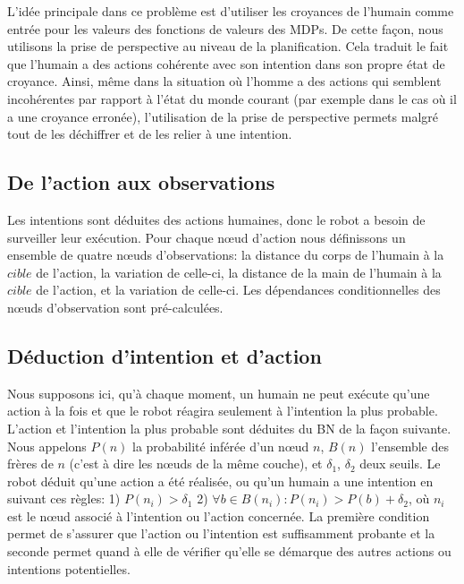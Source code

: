 \documentclass[a4paper,11pt,twoside]{StyleThese}
\begin{document}
L'idée principale dans ce problème est d'utiliser les croyances de l'humain comme entrée pour les valeurs des fonctions de valeurs des MDPs. De cette façon, nous utilisons la prise de perspective au niveau de la planification. Cela traduit le fait que l'humain a des actions cohérente avec son intention dans son propre état de croyance. Ainsi, même dans la situation où l'homme a des actions qui semblent incohérentes par rapport à l'état du monde courant (par exemple dans le cas où il a une croyance erronée), l'utilisation de la prise de perspective permets malgré tout de les déchiffrer et de les relier à une intention.


\subsection{De l'action aux observations}
\label{sec:action}
Les intentions sont déduites des actions humaines, donc le robot a besoin de surveiller leur exécution. Pour chaque nœud d'action nous définissons un ensemble de quatre nœuds d'observations: la distance du corps de l'humain à la $cible$ de l'action, la variation de celle-ci, la distance de la main de l'humain à la $cible$ de l'action, et la variation de celle-ci.
Les dépendances conditionnelles des nœuds d'observation sont pré-calculées.

\subsection{Déduction d'intention et d'action}
\label{intentiom and action inference}
Nous supposons ici, qu'à chaque moment, un humain ne peut exécute qu'une action à la fois et que le robot réagira seulement à l'intention la plus probable. L'action et l'intention la plus probable sont déduites du BN de la façon suivante. Nous appelons $P(n)$ la probabilité inférée d'un nœud  $n$, $B(n)$ l'ensemble des frères de $n$ (c'est à dire les nœuds de la même couche), et $\delta_1$, $\delta_2$ deux seuils. Le robot déduit qu'une action a été réalisée, ou qu'un humain a une intention en suivant ces règles: 1) \(P(n_i)>\delta_1\) 2) \(\forall b \in B(n_i): P(n_i)>P(b)+\delta_2\), où $n_i$ est le nœud associé à l'intention ou l'action concernée.
La première condition permet de s'assurer que l'action ou l'intention est suffisamment probante et la seconde permet quand à elle de vérifier qu'elle se démarque des autres actions ou intentions potentielles.
\end{document}
